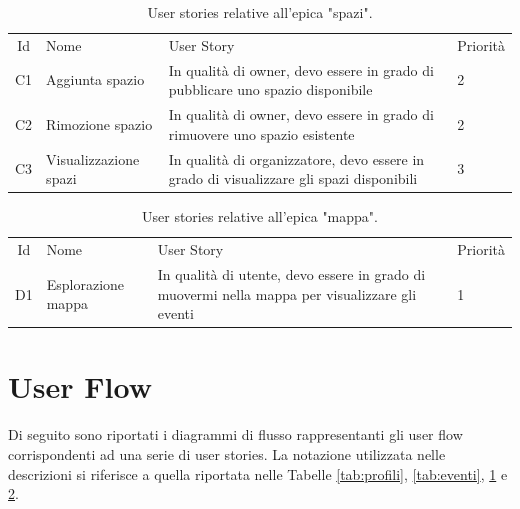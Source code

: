 \documentclass[9pt]{extarticle}
\begin{document}
\begin{table}[!htb]
	\centering
	\renewcommand{\arraystretch}{1.7}
	\begin{tabular}{clp{7cm}l} %
		\toprule
		\rowcolor{gray!20}
		\multicolumn{4}{c}{\textbf{Spazi}}\\ \midrule
		\rowcolor{gray!20}
		Id & Nome & User Story & Priorità \\ \midrule
		C1  & Aggiunta spazio  & In qualità di owner, devo essere in grado di pubblicare uno spazio disponibile & 2\\
		C2 & Rimozione spazio & In qualità di owner, devo essere in grado di rimuovere uno spazio esistente & 2\\
		C3 & Visualizzazione spazi & In qualità di organizzatore, devo essere in grado di visualizzare gli spazi disponibili & 3\\
		\bottomrule
	\end{tabular}
	\caption{User stories relative all'epica "spazi".}
	\label{tab:spazi}
\end{table}



\begin{table}[!htb]
	\centering
	\renewcommand{\arraystretch}{1.7}
	\begin{tabular}{clp{7cm}l} %
		\toprule
		\rowcolor{gray!20}
		\multicolumn{4}{c}{\textbf{Mappa}}\\ \midrule
		\rowcolor{gray!20}
		Id & Nome & User Story & Priorità \\ \midrule
		D1  & Esplorazione mappa      & In qualità di utente, devo essere in grado di muovermi nella mappa per visualizzare gli eventi                           & 1 \\
		\bottomrule
	\end{tabular}
	\caption{User stories relative all'epica "mappa".}
	\label{tab:mappa}
\end{table}

\newpage

\section{User Flow}

Di seguito sono riportati i diagrammi di flusso rappresentanti gli user flow corrispondenti ad una serie di user stories. La notazione utilizzata nelle descrizioni si riferisce a quella riportata nelle Tabelle \ref{tab:profili}, \ref{tab:eventi}, \ref{tab:spazi} e \ref{tab:mappa}.
\end{document}
